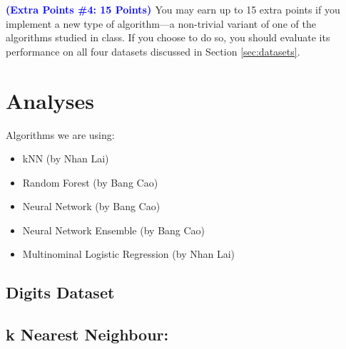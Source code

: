 \documentclass[letterpaper]{article}
\newcommand{\HIGHLIGHT}[1]{\textcolor{blue}{\textbf{#1}}}
\begin{document}
\noindent \HIGHLIGHT{\textcolor{dark-red}{ (Extra Points \#4: 15 Points) }}
You may earn up to 15 extra points if you implement a new type of algorithm---a non-trivial variant of one of the algorithms studied in class. If you choose to do so, you should evaluate its performance on all four datasets discussed in Section \ref{sec:datasets}.

\section{Analyses}

Algorithms we are using:
\begin{itemize}
	\item kNN (by Nhan Lai)
	\item Random Forest (by Bang Cao)
	\item Neural Network (by Bang Cao)
	\item Neural Network Ensemble (by Bang Cao)
	\item Multinominal Logistic Regression (by Nhan Lai)
\end{itemize}

\subsection{Digits Dataset}
\subsection*{k Nearest Neighbour:}
\end{document}
